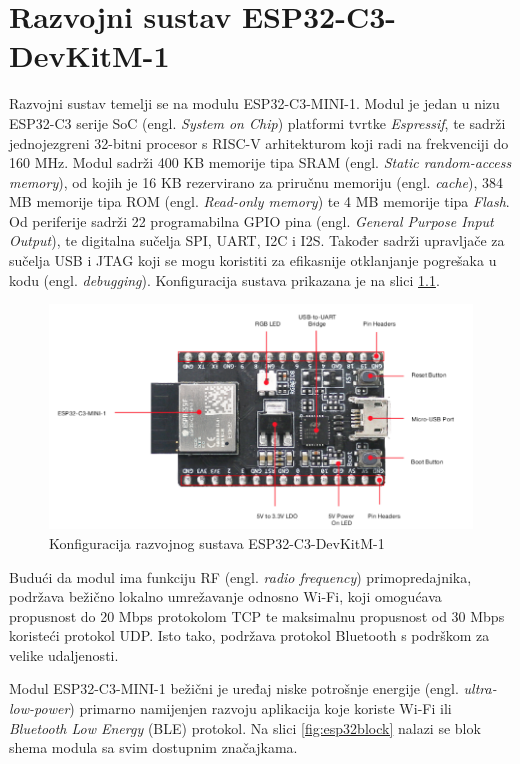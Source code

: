 \chapter{Razvojni sustav ESP32-C3-DevKitM-1}

Razvojni sustav temelji se na modulu ESP32-C3-MINI-1. Modul je jedan u nizu ESP32-­C3 serije SoC (engl. \textit{System on Chip}) platformi tvrtke \textit{Espressif}, te sadrži jednojezgreni 32-bitni procesor s RISC-V arhitekturom koji radi na frekvenciji do 160 MHz. Modul sadrži 400 KB memorije tipa SRAM (engl. \textit{Static random-access memory}), od kojih je 16 KB rezervirano za priručnu memoriju (engl. \textit{cache}), 384 MB memorije tipa ROM (engl. \textit{Read-only memory}) te 4 MB memorije tipa \textit{Flash}. Od periferije sadrži 22 programabilna GPIO pina (engl. \textit{General Purpose Input Output}), te digitalna sučelja SPI, UART, I2C i I2S. Također sadrži upravljače za sučelja USB i JTAG koji se mogu koristiti za efikasnije otklanjanje pogrešaka u kodu (engl. \textit{debugging}). Konfiguracija sustava prikazana je na slici \ref{fig:esp32}. \cite{esp32manual}

\begin{figure}[ht]
	\centering
	\includegraphics[scale=0.6]{imgs/esp32}
	\caption{Konfiguracija razvojnog sustava ESP32-C3-DevKitM-1 \cite{espressif}}
	\label{fig:esp32}
\end{figure}

Budući da modul ima funkciju RF (engl. \textit{radio frequency}) primopredajnika, podržava bežično lokalno umrežavanje odnosno Wi-Fi, koji omogućava propusnost do 20 Mbps protokolom TCP te maksimalnu propusnost od 30 Mbps koristeći protokol UDP. Isto tako, podržava protokol Bluetooth s podrškom za velike udaljenosti. 

Modul ESP32-C3-MINI-1 bežični je uređaj niske potrošnje energije (engl. \textit{ultra-low-power}) primarno namijenjen razvoju aplikacija koje koriste Wi-Fi ili \textit{Bluetooth Low Energy} (BLE) protokol. Na slici \ref{fig:esp32block} nalazi se blok shema modula sa svim dostupnim značajkama. 

